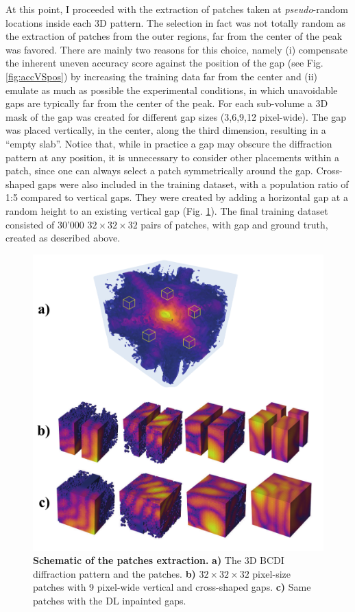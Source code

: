At this point, I proceeded with the extraction of patches taken at \textit{pseudo}-random locations inside each 3D pattern. 
The selection in fact was not totally random as the extraction of patches from the outer regions, far from the 
center of the peak was favored. There are mainly two reasons for this choice, namely (i) compensate the inherent uneven accuracy score against
the position of the gap (see Fig.\ref{fig:accVSpos}) by increasing the training data far from the center and (ii) emulate
as much as possible the experimental conditions, in which unavoidable gaps are typically far from the center of the peak.
For each sub-volume a 3D mask of the gap was created for different gap sizes (3,6,9,12 pixel-wide). The gap was placed 
vertically, in the center, along the third dimension, resulting in a ``empty slab''. Notice that, while in practice a 
gap may obscure the diffraction pattern at any position, it is unnecessary to consider other placements within a 
patch, since one can always select a patch symmetrically around the gap. Cross-shaped gaps were also 
included in the training dataset, with a population ratio of 1:5 compared to vertical gaps. They were created by 
adding a horizontal gap at a random height to an existing vertical gap (Fig. \ref{fig:patches_method}).
The final training dataset consisted of 30'000 $32\times32\times32$ pairs of patches, with gap and ground truth, 
created as described above. 

\begin{figure}[h]
    \centering
    \includegraphics[width=.6\textwidth]{figures/Inpainting/process.pdf}
    \caption{\textbf{Schematic of the patches extraction.} \textbf{a)} The 3D BCDI diffraction pattern and the 
    patches. \textbf{b)} $32\times32\times32$ pixel-size patches with 9 pixel-wide vertical and cross-shaped gaps.
    \textbf{c)} Same patches with the DL inpainted gaps.}
    \label{fig:patches_method}
\end{figure}

